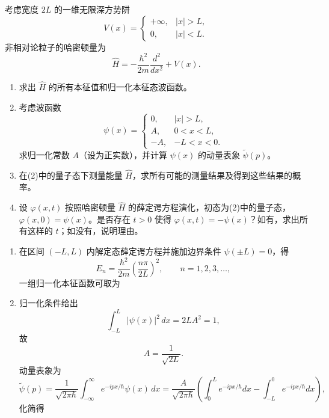 ﻿


\begin{question}
考虑宽度 $2L$ 的一维无限深方势阱
\[
V(x)=
\begin{cases}
+\infty,& |x|>L,\\
0,& |x|<L.
\end{cases}
\]
非相对论粒子的哈密顿量为
\[
\hat H=-\frac{\hbar^2}{2m}\frac{d^2}{dx^2}+V(x).
\]

\begin{enumerate}[label=(\arabic*),leftmargin=2.5em]
  \item 求出 $\hat H$ 的所有本征值和归一化本征态波函数。
  \item 考虑波函数
  \[
  \psi(x)=
  \begin{cases}
  0,& |x|>L,\\
  A,& 0<x<L,\\
  -A,& -L<x<0.
  \end{cases}
  \]
  求归一化常数 $A$（设为正实数），并计算 $\psi(x)$ 的动量表象 $\tilde\psi(p)$。
  \item 在(2)中的量子态下测量能量 $\hat H$，求所有可能的测量结果及得到这些结果的概率。
  \item 设 $\varphi(x,t)$ 按照哈密顿量 $\hat H$ 的薛定谔方程演化，初态为(2)中的量子态，$\varphi(x,0)=\psi(x)$。是否存在 $t>0$ 使得 $\varphi(x,t)=-\psi(x)$？如有，求出所有这样的 $t$；如没有，说明理由。
\end{enumerate}

\begin{solution}
\begin{enumerate}[label=(\arabic*),leftmargin=2.5em]
  \item 在区间 $(-L,L)$ 内解定态薛定谔方程并施加边界条件 $\psi(\pm L)=0$，得
  \[
  E_n=\frac{\hbar^2}{2m}\left(\frac{n\pi}{2L}\right)^2,
  \qquad n=1,2,3,\dots,
  \]
  一组归一化本征函数可取为

  \item 归一化条件给出
  \[
  \int_{-L}^L |\psi(x)|^2\,dx=2L A^2=1,
  \]
  故
  \[
  A=\frac{1}{\sqrt{2L}}.
  \]
  动量表象为
  \[
  \tilde\psi(p)=\frac{1}{\sqrt{2\pi\hbar}}\int_{-\infty}^{\infty}e^{-ipx/\hbar}\psi(x)\,dx
  =\frac{A}{\sqrt{2\pi\hbar}}\left(\int_0^L e^{-ipx/\hbar}dx-\int_{-L}^0 e^{-ipx/\hbar}dx\right),
  \]
  化简得


\end{enumerate}
\end{solution}
\end{question}

